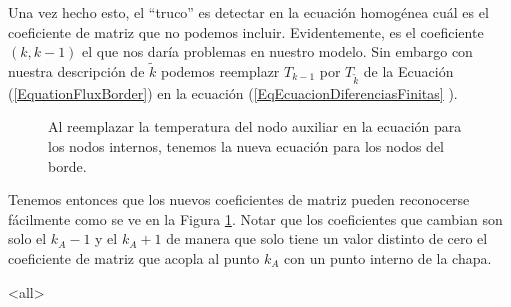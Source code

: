 
Una vez hecho esto, el ``truco''  es detectar en la ecuación homogénea cuál es
el coeficiente de matriz que no podemos incluir. Evidentemente, es el coeficiente
$(k,k-1)$ el que nos daría problemas en nuestro modelo. Sin embargo
con nuestra descripción de $\tilde{k}$ podemos reemplazr $T_{k-1}$ por 
$T_{\tilde{k}}$ de la Ecuación (\ref{EquationFluxBorder}) en la 
ecuación (\ref{EqEcuacionDiferenciasFinitas} ).

\begin{figure}
  \caption{\protect\label{FiguraCoeficientesMatrizFluxLeft} Al reemplazar
  la temperatura del nodo auxiliar en la ecuación para los nodos internos, 
  tenemos la nueva ecuación para los nodos del borde.} 
\end{figure}

Tenemos entonces que los nuevos coeficientes de matriz pueden reconocerse fácilmente
como se ve en la Figura \ref{FiguraCoeficientesMatrizFluxLeft}. Notar 
que los coeficientes que cambian son solo el $k_A - 1$ y el $k_A + 1$
de manera que solo tiene un valor distinto de cero el coeficiente de matriz que 
acopla al punto $k_A$ con un punto interno de la chapa. 

\mode*
\mode<all>
